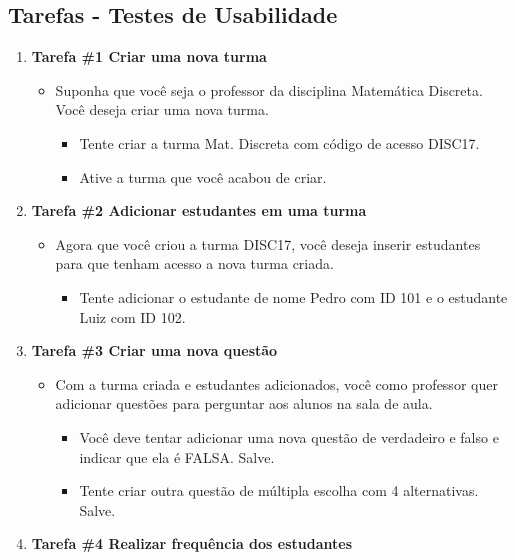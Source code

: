\begin{apendicesenv}
\chapter{Tarefas - Testes de Usabilidade}\label{appendix:tasks}

\begin{enumerate}
  \item \textbf{Tarefa \#1 Criar uma nova turma}
  \begin{itemize}
    \item Suponha que você seja o professor da disciplina Matemática Discreta. Você deseja criar uma nova turma.
    \begin{itemize}
      \item Tente criar a turma Mat. Discreta com código de acesso DISC17.
      \item Ative a turma que você acabou de criar.
    \end{itemize}
  \end{itemize}

  \item \textbf{Tarefa \#2 Adicionar estudantes em uma turma}
  \begin{itemize}
    \item Agora que você criou a turma DISC17, você deseja inserir estudantes para que tenham acesso a nova turma criada.
    \begin{itemize}
      \item Tente adicionar o estudante de nome Pedro com ID 101 e o estudante Luiz com ID 102.
    \end{itemize}
  \end{itemize}

  \item \textbf{Tarefa \#3 Criar uma nova questão}
  \begin{itemize}
    \item Com a turma criada e estudantes adicionados, você como professor quer adicionar questões para perguntar aos alunos na sala de aula.
    \begin{itemize}
      \item Você deve tentar adicionar uma nova questão de verdadeiro e falso e indicar que ela é FALSA. Salve.
      \item Tente criar outra questão de múltipla escolha com 4 alternativas. Salve.
    \end{itemize}
  \end{itemize}

  \item \textbf{Tarefa \#4 Realizar frequência dos estudantes}


\end{enumerate}
\end{apendicesenv}
